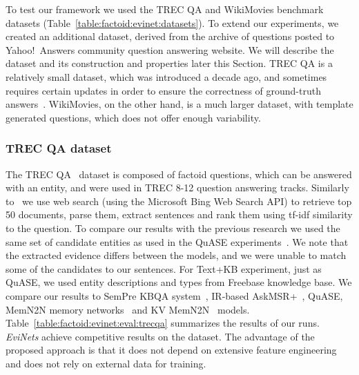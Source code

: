 To test our framework we used the TREC QA and WikiMovies benchmark datasets (Table~\ref{table:factoid:evinet:datasets}).
To extend our experiments, we created an additional dataset, derived from the archive of questions posted to Yahoo!~Answers community question answering website.
We will describe the dataset and its construction and properties later this Section.
TREC QA is a relatively small dataset, which was introduced a decade ago, and sometimes requires certain updates in order to ensure the correctness of ground-truth answers~\cite{tsai2015web}.
WikiMovies, on the other hand, is a much larger dataset, with template generated questions, which does not offer enough variability.

\subsubsection{TREC QA dataset}
\label{section:factoid:evinet:eval:trecqa}

The TREC QA~\cite{Sun:2015:ODQ:2736277.2741651} dataset is composed of factoid questions, which can be answered with an entity, and were used in TREC 8-12 question answering tracks.
Similarly to~\cite{Sun:2015:ODQ:2736277.2741651} we use web search (using the Microsoft Bing Web Search API) to retrieve top 50 documents, parse them, extract sentences and rank them using tf-idf similarity to the question.
To compare our results with the previous research we used the same set of candidate entities as used in the QuASE experiments~\cite{Sun:2015:ODQ:2736277.2741651}.
We note that the extracted evidence differs between the models, and we were unable to match some of the candidates to our sentences.
For Text+KB experiment, just as QuASE, we used entity descriptions and types from Freebase knowledge base.
We compare our results to SemPre KBQA system~\cite{BerantCFL13:sempre}, IR-based AskMSR+~\cite{tsai2015web}, QuASE, MemN2N memory networks~\cite{sukhbaatar2015end} and KV MemN2N~\cite{miller2016key} models.
Table~\ref{table:factoid:evinet:eval:trecqa} summarizes the results of our runs.
\textit{EviNets} achieve competitive results on the dataset.
The advantage of the proposed approach is that it does not depend on extensive feature engineering and does not rely on external data for training.

